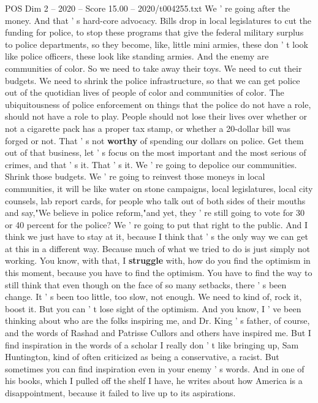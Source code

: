 \begin{textsample}{POS Dim 2 – 2020 – Score 15.00 – 2020/t004255.txt}
We ' re going after the money.
And that ' s hard-core advocacy.
Bills drop in local legislatures to cut the funding for police, to stop these programs that give the federal military surplus to police departments, so they become, like, little mini armies, these don ' t look like police officers, these look like standing armies.
And the enemy are communities of color.
So we need to take away their toys.
We need to cut their budgets.
We need to shrink the police infrastructure, so that we can get police out of the quotidian lives of people of color and communities of color.
The ubiquitousness of police enforcement on things that the police do not have a role, should not have a role to play.
People should not lose their lives over whether or not a cigarette pack has a proper tax stamp, or whether a 20-dollar bill was forged or not.
That ' s not \textbf{worthy} of spending our dollars on police.
Get them out of that business, let ' s focus on the most important and the most serious of crimes, and that ' s it.
That ' s it.
We ' re going to depolice our communities.
Shrink those budgets.
We ' re going to reinvest those moneys in local communities, it will be like water on stone campaigns, local legislatures, local city counsels, lab report cards, for people who talk out of both sides of their mouths and say,"We believe in police reform,"and yet, they ' re still going to vote for 30 or 40 percent for the police?
We ' re going to put that right to the public.
And I think we just have to stay at it, because I think that ' s the only way we can get at this in a different way.
Because much of what we tried to do is just simply not working.
You know, with that, I \textbf{struggle} with, how do you find the optimism in this moment, because you have to find the optimism.
You have to find the way to still think that even though on the face of so many setbacks, there ' s been change.
It ' s been too little, too slow, not enough.
We need to kind of, rock it, boost it.
But you can ' t lose sight of the optimism.
And you know, I ' ve been thinking about who are the folks inspiring me, and Dr.
King ' s father, of course, and the words of Rashad and Patrisse Cullors and others have inspired me.
But I find inspiration in the words of a scholar I really don ' t like bringing up, Sam Huntington, kind of often criticized as being a conservative, a racist.
But sometimes you can find inspiration even in your enemy ' s words.
And in one of his books, which I pulled off the shelf I have, he writes about how America is a disappointment, because it failed to live up to its aspirations.

\end{textsample}
